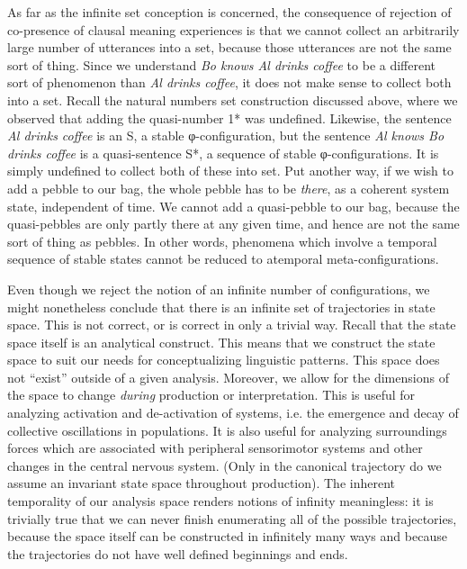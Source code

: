   As far as the infinite set conception is concerned, the consequence of rejection of co-presence of clausal meaning experiences is that we cannot collect an arbitrarily large number of utterances into a set, because those utterances are not the same sort of thing. Since we understand \textit{Bo knows Al drinks coffee} to be a different sort of phenomenon than \textit{Al drinks coffee}, it does not make sense to collect both into a set. Recall the natural numbers set construction discussed above, where we observed that adding the quasi-number 1* was undefined. Likewise, the sentence \textit{Al drinks coffee} is an S, a stable φ-configuration, but the sentence \textit{Al knows Bo drinks coffee} is a quasi-sentence S*, a sequence of stable φ-configurations. It is simply undefined to collect both of these into set. Put another way, if we wish to add a pebble to our bag, the whole pebble has to be \textit{there}, as a coherent system state, independent of time. We cannot add a quasi-pebble to our bag, because the quasi-pebbles are only partly there at any given time, and hence are not the same sort of thing as pebbles. In other words, phenomena which involve a temporal sequence of stable states cannot be reduced to atemporal meta-configurations.

  Even though we reject the notion of an infinite number of configurations, we might nonetheless conclude that there is an infinite set of trajectories in state space. This is not correct, or is correct in only a trivial way. Recall that the state space itself is an analytical construct. This means that we construct the state space to suit our needs for conceptualizing linguistic patterns. This space does not “exist” outside of a given analysis. Moreover, we allow for the dimensions of the space to change \textit{during} production or interpretation. This is useful for analyzing activation and de-activation of systems, i.e. the emergence and decay of collective oscillations in populations. It is also useful for analyzing surroundings forces which are associated with peripheral sensorimotor systems and other changes in the central nervous system.  (Only in the canonical trajectory do we assume an invariant state space throughout production). The inherent temporality of our analysis space renders notions of infinity meaningless: it is trivially true that we can never finish enumerating all of the possible trajectories, because the space itself can be constructed in infinitely many ways and because the trajectories do not have well defined beginnings and ends.

